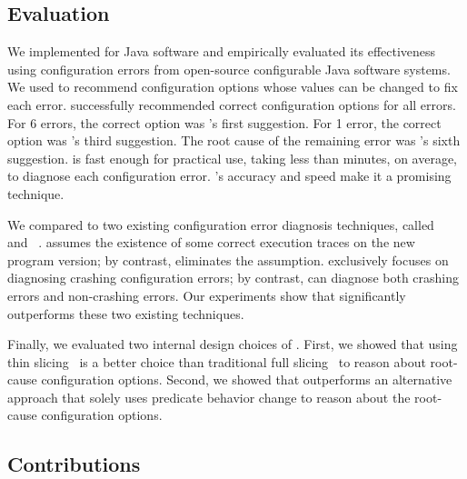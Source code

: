 \subsection{Evaluation}

We implemented \ourtool for Java software and empirically evaluated
its effectiveness using \errornum configuration errors
from \subjnum open-source configurable Java software systems. 
We used \ourtool to recommend configuration options whose values
can be changed to fix each error.
\ourtool successfully recommended correct configuration options
for all \errornum errors. For 6 errors, the correct option was \ourtool's first
suggestion. For 1 error, the correct option was
\ourtool's third suggestion. The root cause of the remaining
error was \ourtool's sixth suggestion. \ourtool is fast enough for practical use,
taking less than \avgtime minutes,
on average, to diagnose each configuration error.
\ourtool's accuracy and speed make it a promising technique.


We compared \ourtool to two existing configuration error diagnosis
techniques, called \prevtool~\cite{Zhang:2013:ADS}
and \conftool~\cite{Rabkin:2011:PPC}.
\prevtool assumes the existence of some correct execution traces
on the new program version; by contrast, \ourtool eliminates the
assumption.
\conftool exclusively focuses on diagnosing crashing configuration errors;
by contrast, \ourtool can diagnose both crashing errors and
non-crashing errors.
Our experiments
show that \ourtool significantly outperforms these two existing techniques.

Finally, we evaluated two internal design choices of \ourtool. First, we 
showed that using thin slicing~\cite{Sridharan:2007} is a better choice than
traditional full slicing~\cite{Horwitz:1988} to reason about 
root-cause configuration options. Second, we showed that 
\ourtool outperforms an alternative approach
that solely uses predicate behavior change to reason about
the root-cause configuration options.




\subsection{Contributions}

